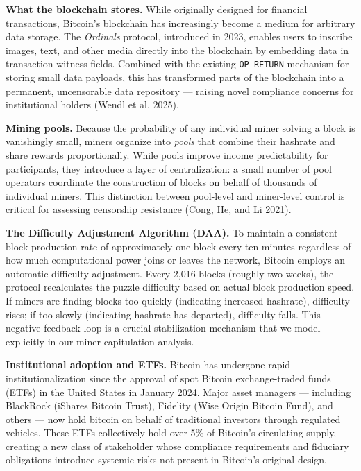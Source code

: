 \documentclass[
  11pt,
]{article}
\begin{document}
\textbf{What the blockchain stores.} While originally designed for
financial transactions, Bitcoin's blockchain has increasingly become a
medium for arbitrary data storage. The \emph{Ordinals} protocol,
introduced in 2023, enables users to inscribe images, text, and other
media directly into the blockchain by embedding data in transaction
witness fields. Combined with the existing \texttt{OP\_RETURN} mechanism
for storing small data payloads, this has transformed parts of the
blockchain into a permanent, uncensorable data repository --- raising
novel compliance concerns for institutional holders (Wendl et al. 2025).

\textbf{Mining pools.} Because the probability of any individual miner
solving a block is vanishingly small, miners organize into \emph{pools}
that combine their hashrate and share rewards proportionally. While
pools improve income predictability for participants, they introduce a
layer of centralization: a small number of pool operators coordinate the
construction of blocks on behalf of thousands of individual miners. This
distinction between pool-level and miner-level control is critical for
assessing censorship resistance (Cong, He, and Li 2021).

\textbf{The Difficulty Adjustment Algorithm (DAA).} To maintain a
consistent block production rate of approximately one block every ten
minutes regardless of how much computational power joins or leaves the
network, Bitcoin employs an automatic difficulty adjustment. Every 2,016
blocks (roughly two weeks), the protocol recalculates the puzzle
difficulty based on actual block production speed. If miners are finding
blocks too quickly (indicating increased hashrate), difficulty rises; if
too slowly (indicating hashrate has departed), difficulty falls. This
negative feedback loop is a crucial stabilization mechanism that we
model explicitly in our miner capitulation analysis.

\textbf{Institutional adoption and ETFs.} Bitcoin has undergone rapid
institutionalization since the approval of spot Bitcoin exchange-traded
funds (ETFs) in the United States in January 2024. Major asset managers
--- including BlackRock (iShares Bitcoin Trust), Fidelity (Wise Origin
Bitcoin Fund), and others --- now hold bitcoin on behalf of traditional
investors through regulated vehicles. These ETFs collectively hold over
5\% of Bitcoin's circulating supply, creating a new class of stakeholder
whose compliance requirements and fiduciary obligations introduce
systemic risks not present in Bitcoin's original design.
\end{document}
